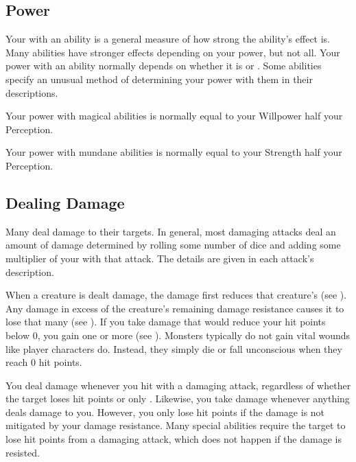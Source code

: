     \subsection{Power}\label{Power}
        Your  with an ability is a general measure of how strong the ability's effect is.
        Many abilities have stronger effects depending on your power, but not all.
        Your power with an ability normally depends on whether it is  or .
        Some abilities specify an unusual method of determining your power with them in their descriptions.

        Your power with magical abilities is normally equal to your Willpower \add half your Perception.

        Your power with mundane abilities is normally equal to your Strength \add half your Perception.

    \subsection{Dealing Damage}\label{Dealing Damage}
        Many  deal damage to their targets.
        In general, most damaging attacks deal an amount of damage determined by rolling some number of dice and adding some multiplier of your  with that attack.
        The details are given in each attack's description.

        When a creature is dealt damage, the damage first reduces that creature's  (see ).
        Any damage in excess of the creature's remaining damage resistance causes it to lose that many  (see ).
        If you take damage that would reduce your hit points below 0, you gain one or more  (see ).
        Monsters typically do not gain vital wounds like player characters do.
        Instead, they simply die or fall unconscious when they reach 0 hit points.

        You deal damage whenever you hit with a damaging attack, regardless of whether the target loses hit points or only .
        Likewise, you take damage whenever anything deals damage to you.
        However, you only lose hit points if the damage is not mitigated by your damage resistance.
        Many special abilities require the target to lose hit points from a damaging attack, which does not happen if the damage is resisted.

